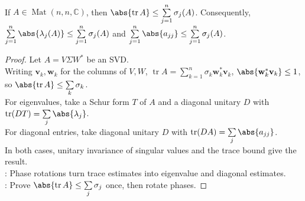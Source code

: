 \begin{theorem} \label{thm:trace-bounded-by-singular-values} \\
If $A\in\operatorname{Mat}(n,n,\mathbb{C})$, then $\abs{\operatorname{tr}A}\leq\sum\limits_{j=1}^{n}\sigma_j(A)$. Consequently, $\sum\limits_{j=1}^{n}\abs{\lambda_j(A)}\leq\sum\limits_{j=1}^{n}\sigma_j(A)$ and $\sum\limits_{j=1}^{n}\abs{a_{jj}}\leq\sum\limits_{j=1}^{n}\sigma_j(A)$.
\begin{proof}
Let $A=V\Sigma W^*$ be an SVD.\\
Writing $\mathbf{v}_k,\mathbf{w}_k$ for the columns of $V,W$, $\operatorname{tr}A =\sum\limits_{k=1}^{n}\sigma_k\mathbf{w}_k^*\mathbf{v}_k$, $\abs{\mathbf{w}_k^*\mathbf{v}_k}\leq1$, so $\abs{\operatorname{tr}A}\leq\sum\limits_k\sigma_k$.\\
For eigenvalues, take a Schur form $T$ of $A$ and a diagonal unitary $D$ with $\operatorname{tr}(DT)=\sum\limits_j\abs{\lambda_j}$.\\
For diagonal entries, take diagonal unitary $D$ with $\operatorname{tr}(DA)=\sum\limits_j\abs{a_{jj}}$.\\
In both cases, unitary invariance of singular values and the trace bound give the result.\\
: Phase rotations turn trace estimates into eigenvalue and diagonal estimates.\\
: Prove $\abs{\operatorname{tr}A}\leq\sum\limits_j\sigma_j$ once, then rotate phases.
\end{proof}
\end{theorem}

